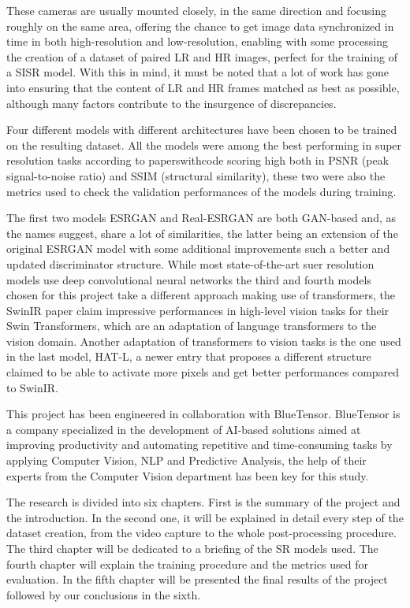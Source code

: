 These cameras are usually mounted closely, in the same direction and focusing roughly on the same area, offering the chance to get image data synchronized in time in both high-resolution and low-resolution, enabling with some processing the creation of a dataset of paired LR and HR images, perfect for the training of a SISR model. With this in mind, it must be noted that a lot of work has gone into ensuring that the content of LR and HR frames matched as best as possible, although many factors contribute to the insurgence of discrepancies.

Four different models with different architectures have been chosen to be trained on the resulting dataset. All the models were among the best performing in super resolution tasks according to paperswithcode \cite{pwcode} scoring high both in PSNR\cite{psnr} (peak signal-to-noise ratio) and SSIM\cite{ssim} (structural similarity), these two were also the metrics used to check the validation performances of the models during training.

The first two models ESRGAN\cite{wang2018esrgan} and Real-ESRGAN\cite{wang2021realesrgan} are both GAN-based and, as the names suggest, share a lot of similarities, the latter being an extension of the original ESRGAN model with some additional improvements such a better and updated discriminator structure. While most state-of-the-art suer resolution models use deep convolutional neural networks the third and fourth models chosen for this project take a different approach making use of transformers, the SwinIR\cite{liang2021swinir} paper claim impressive performances in high-level vision tasks for their Swin Transformers\cite{liu2021swin}, which are an adaptation of language transformers to the vision domain. Another adaptation of transformers to vision tasks is the one used in the last model, HAT-L\cite{chen2023activating}, a newer entry that proposes a different structure claimed to be able to activate more pixels and get better performances compared to SwinIR.

This project has been engineered in collaboration with BlueTensor. BlueTensor is a company specialized in the development of AI-based solutions aimed at improving productivity and automating repetitive and time-consuming tasks by applying Computer Vision, NLP and Predictive Analysis, the help of their experts from the Computer Vision department has been key for this study.

The research is divided into six chapters. First is the summary of the project and the introduction. In the second one, it will be explained in detail every step of the dataset creation, from the video capture to the whole post-processing procedure. The third chapter will be dedicated to a briefing of the SR models used. The fourth chapter will explain the training procedure and the metrics used for evaluation. In the fifth chapter will be presented the final results of the project followed by our conclusions in the sixth.

